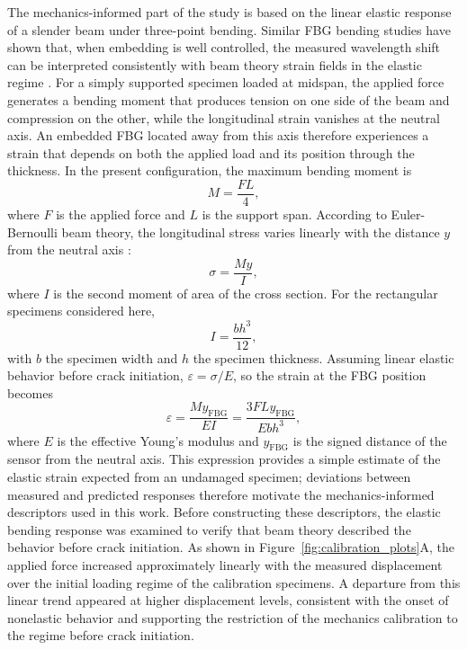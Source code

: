 \documentclass[fleqn,10pt]{wlscirep}
\begin{document}
The mechanics-informed part of the study is based on the linear elastic response of a slender beam under three-point bending. Similar FBG bending studies have shown that, when embedding is well controlled, the measured wavelength shift can be interpreted consistently with beam theory strain fields in the elastic regime \cite{gabardi2023}. For a simply supported specimen loaded at midspan, the applied force generates a bending moment that produces tension on one side of the beam and compression on the other, while the longitudinal strain vanishes at the neutral axis. An embedded FBG located away from this axis therefore experiences a strain that depends on both the applied load and its position through the thickness. In the present configuration, the maximum bending moment is
\[
M = \frac{F L}{4},
\]
where $F$ is the applied force and $L$ is the support span. According to Euler-Bernoulli beam theory, the longitudinal stress varies linearly with the distance $y$ from the neutral axis \cite{ochsner2021}:
\[
\sigma = \frac{M y}{I},
\]
where $I$ is the second moment of area of the cross section. For the rectangular specimens considered here,
\[
I = \frac{b h^3}{12},
\]
with $b$ the specimen width and $h$ the specimen thickness. Assuming linear elastic behavior before crack initiation, $\varepsilon = \sigma / E$, so the strain at the FBG position becomes
\begin{equation}
\varepsilon = \frac{M y_{\mathrm{FBG}}}{E I} = \frac{3 F L y_{\mathrm{FBG}}}{E b h^3},
\label{eq:euler_bernoulli_strain}
\end{equation}
where $E$ is the effective Young's modulus and $y_{\mathrm{FBG}}$ is the signed distance of the sensor from the neutral axis. This expression provides a simple estimate of the elastic strain expected from an undamaged specimen; deviations between measured and predicted responses therefore motivate the mechanics-informed descriptors used in this work. Before constructing these descriptors, the elastic bending response was examined to verify that beam theory described the behavior before crack initiation. As shown in Figure~\ref{fig:calibration_plots}A, the applied force increased approximately linearly with the measured displacement over the initial loading regime of the calibration specimens. A departure from this linear trend appeared at higher displacement levels, consistent with the onset of nonelastic behavior and supporting the restriction of the mechanics calibration to the regime before crack initiation.
\end{document}
